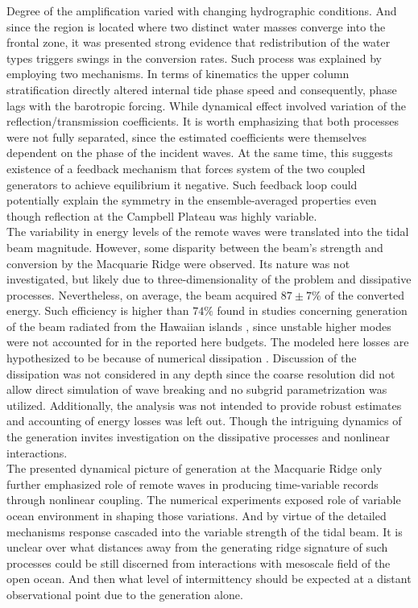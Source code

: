 \documentclass[12pt]{article}
\begin{document}
Degree of the amplification varied with changing hydrographic conditions. And 
since the region is located where two distinct water masses converge into the frontal zone, 
it was presented strong evidence that redistribution of the water types triggers swings in the 
conversion 
rates. Such process was explained by employing two mechanisms. In terms of kinematics the upper 
column 
stratification directly altered internal tide phase speed and consequently, phase lags with the 
barotropic forcing. While dynamical effect involved variation of the reflection/transmission 
coefficients. It is worth emphasizing that both processes were not fully separated, since the 
estimated coefficients were themselves dependent on the phase of the incident waves. At the same 
time, this suggests existence of a feedback mechanism that forces system of the two coupled 
generators to achieve equilibrium it negative. Such feedback loop could potentially explain the 
symmetry in the ensemble-averaged properties even though reflection at the Campbell Plateau was 
highly 
variable.\\

The variability in energy levels of the remote waves were translated into the tidal beam magnitude. 
However, some disparity between the beam's strength and conversion by the Macquarie Ridge were 
observed. Its nature was not investigated, but likely due to three-dimensionality of the problem 
and dissipative processes. Nevertheless, on average, the beam acquired $87 \pm 7\%$ of the 
converted 
energy. 
Such efficiency is higher than $74\%$ found in studies concerning generation of the beam radiated 
from the Hawaiian islands \citep{carter2008energetics}, since unstable higher modes were not 
accounted for in the reported here budgets. The modeled here losses are hypothesized to be because 
of numerical dissipation \citep{di2006numerical}. Discussion of the dissipation was not considered 
in any depth since the coarse resolution did not 
allow direct simulation of wave breaking and no subgrid parametrization was utilized. Additionally, 
the analysis was not intended to provide robust estimates and accounting of energy losses 
was left out. Though the intriguing dynamics of the generation invites investigation on the 
dissipative processes and nonlinear interactions.\\

The presented dynamical picture of generation at the Macquarie Ridge only further emphasized role 
of remote waves in producing time-variable records through nonlinear coupling. The numerical 
experiments 
exposed role of 
variable ocean environment in shaping those variations. And by virtue of the detailed mechanisms 
response cascaded into the variable strength of the tidal beam. It is unclear over 
what distances away from the generating ridge signature of such processes could be still discerned 
from interactions with mesoscale field of the open ocean. And then what level of 
intermittency should be expected at a distant observational point due to the generation alone.
\end{document}
